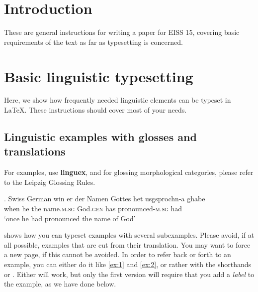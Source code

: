 



\section{Introduction}\label{sec:1}

These are general instructions for writing a paper for EISS 15, covering basic requirements of the text as far as typesetting is concerned.


\section{Basic linguistic typesetting}

Here, we show how frequently needed linguistic elements can be typeset in \LaTeX. These instructions should cover most of your needs. 

\subsection{Linguistic examples with glosses and translations}

For examples, use \textbf{linguex}, and for glossing morphological categories, please refer to the Leipzig Glossing Rules.

\ex. Swiss German \citep[][346]{hodler69}
\gll win er der Namen Gottes het usgsprochn-a ghabe\\
when he the name.\textsc{m.sg} God.\textsc{gen} has pronounced-\textsc{m.sg} had\\
`once he had pronounced the name of God'

\Next shows how you can typeset examples with several subexamples. Please avoid, if at all possible, examples that are cut from their translation. You may want to force a new page, if this cannot be avoided. In order to refer back or forth to an example, you can either do it like \ref{ex:1} and \ref{ex:2}, or rather with the shorthands \Next[c] or \Last. Either will work, but only the first version will require that you add a \emph{label} to the example, as we have done below.


